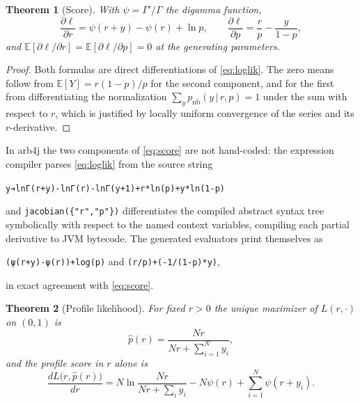 \documentclass[11pt]{article}
\newtheorem{theorem}{Theorem}[section]
\begin{document}
\begin{theorem}[Score]\label{thm:score}
With $\psi=\Gamma'/\Gamma$ the digamma function,
\begin{equation}
\frac{\partial\ell}{\partial r}=\psi(r+y)-\psi(r)+\ln p,
\qquad
\frac{\partial\ell}{\partial p}=\frac{r}{p}-\frac{y}{1-p},
\label{eq:score}
\end{equation}
and $\mathbb{E}[\partial\ell/\partial r]=\mathbb{E}[\partial\ell/\partial p]=0$
at the generating parameters.
\end{theorem}

\begin{proof}
Both formulas are direct differentiations of \eqref{eq:loglik}. The zero
means follow from $\mathbb{E}[Y]=r(1-p)/p$ for the second component, and for
the first from differentiating the normalization
$\sum_{y}p_{\mathrm{nb}}(y\,|\,r,p)=1$ under the sum with respect to $r$,
which is justified by locally uniform convergence of the series and its
$r$-derivative.
\end{proof}

In arb4j the two components of \eqref{eq:score} are not hand-coded: the
expression compiler parses \eqref{eq:loglik} from the source string
\begin{center}
\verb|y➔lnΓ(r+y)-lnΓ(r)-lnΓ(y+1)+r*ln(p)+y*ln(1-p)|
\end{center}
and \texttt{jacobian(\{"r","p"\})} differentiates the compiled abstract
syntax tree symbolically with respect to the named context variables,
compiling each partial derivative to JVM bytecode. The generated evaluators
print themselves as
\begin{center}
\verb|(ψ(r+y)-ψ(r))+log(p)| \qquad and \qquad \verb|(r/p)+(-1/(1-p)*y)|,
\end{center}
in exact agreement with \eqref{eq:score}.

\begin{theorem}[Profile likelihood]\label{thm:profile}
For fixed $r>0$ the unique maximizer of $L(r,\cdot)$ on $(0,1)$ is
\begin{equation}
\hat p(r)=\frac{Nr}{Nr+\sum_{i=1}^{N}y_{i}},
\label{eq:profile}
\end{equation}
and the profile score in $r$ alone is
\begin{equation}
\frac{dL\bigl(r,\hat p(r)\bigr)}{dr}
=N\ln\!\frac{Nr}{Nr+\sum_{i}y_{i}}-N\psi(r)+\sum_{i=1}^{N}\psi(r+y_{i}).
\label{eq:profileScore}
\end{equation}
\end{theorem}
\end{document}

